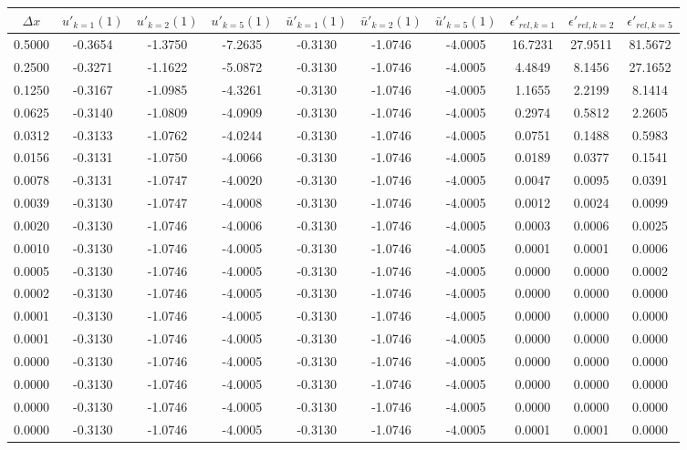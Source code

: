 \begin{tabular}{|c|c|c|c|c|c|c|c|c|c|}
\hline
\textbf{$\Delta x$}&\textbf{$u'_{k=1}(1)$}&\textbf{$u'_{k=2}(1)$}&\textbf{$u'_{k=5}(1)$}&\textbf{$\bar{u}'_{k=1}(1)$}&\textbf{$\bar{u}'_{k=2}(1)$}&\textbf{$\bar{u}'_{k=5}(1)$}&\textbf{$\epsilon'_{rel,k=1}$}&\textbf{$\epsilon'_{rel,k=2}$}&\textbf{$\epsilon'_{rel,k=5}$}\\\hline
0.5000&-0.3654&-1.3750&-7.2635&-0.3130&-1.0746&-4.0005&16.7231&27.9511&81.5672\\\hline
0.2500&-0.3271&-1.1622&-5.0872&-0.3130&-1.0746&-4.0005&4.4849&8.1456&27.1652\\\hline
0.1250&-0.3167&-1.0985&-4.3261&-0.3130&-1.0746&-4.0005&1.1655&2.2199&8.1414\\\hline
0.0625&-0.3140&-1.0809&-4.0909&-0.3130&-1.0746&-4.0005&0.2974&0.5812&2.2605\\\hline
0.0312&-0.3133&-1.0762&-4.0244&-0.3130&-1.0746&-4.0005&0.0751&0.1488&0.5983\\\hline
0.0156&-0.3131&-1.0750&-4.0066&-0.3130&-1.0746&-4.0005&0.0189&0.0377&0.1541\\\hline
0.0078&-0.3131&-1.0747&-4.0020&-0.3130&-1.0746&-4.0005&0.0047&0.0095&0.0391\\\hline
0.0039&-0.3130&-1.0747&-4.0008&-0.3130&-1.0746&-4.0005&0.0012&0.0024&0.0099\\\hline
0.0020&-0.3130&-1.0746&-4.0006&-0.3130&-1.0746&-4.0005&0.0003&0.0006&0.0025\\\hline
0.0010&-0.3130&-1.0746&-4.0005&-0.3130&-1.0746&-4.0005&0.0001&0.0001&0.0006\\\hline
0.0005&-0.3130&-1.0746&-4.0005&-0.3130&-1.0746&-4.0005&0.0000&0.0000&0.0002\\\hline
0.0002&-0.3130&-1.0746&-4.0005&-0.3130&-1.0746&-4.0005&0.0000&0.0000&0.0000\\\hline
0.0001&-0.3130&-1.0746&-4.0005&-0.3130&-1.0746&-4.0005&0.0000&0.0000&0.0000\\\hline
0.0001&-0.3130&-1.0746&-4.0005&-0.3130&-1.0746&-4.0005&0.0000&0.0000&0.0000\\\hline
0.0000&-0.3130&-1.0746&-4.0005&-0.3130&-1.0746&-4.0005&0.0000&0.0000&0.0000\\\hline
0.0000&-0.3130&-1.0746&-4.0005&-0.3130&-1.0746&-4.0005&0.0000&0.0000&0.0000\\\hline
0.0000&-0.3130&-1.0746&-4.0005&-0.3130&-1.0746&-4.0005&0.0000&0.0000&0.0000\\\hline
0.0000&-0.3130&-1.0746&-4.0005&-0.3130&-1.0746&-4.0005&0.0001&0.0001&0.0000\\\hline
\end{tabular}
